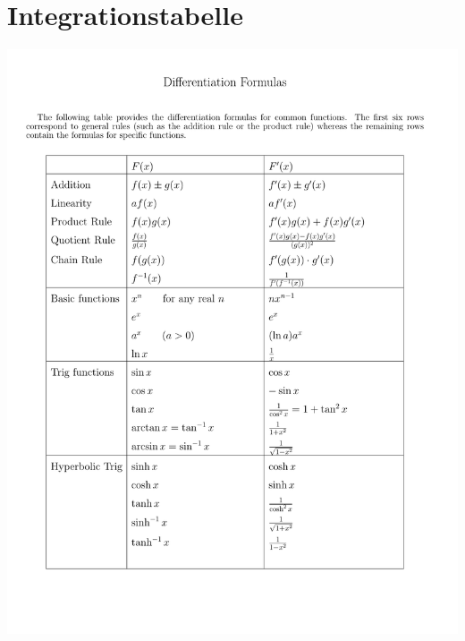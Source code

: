 \section{Integrationstabelle}

\begin{center}
\includegraphics[page=2,width=18cm,trim=1.25cm 3cm 4.5cm 4cm,clip]{./files/calcrulz.pdf}
\end{center}
